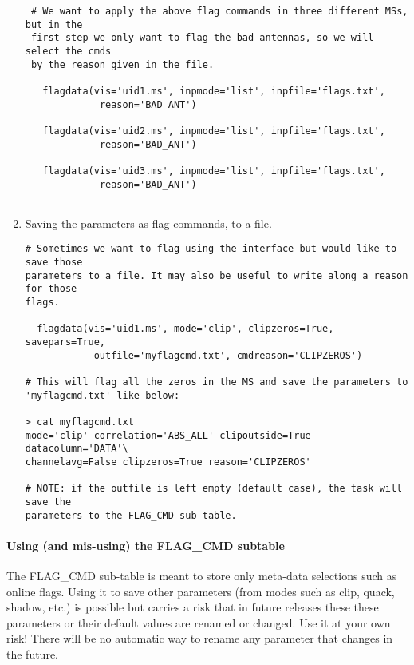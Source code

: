 \begin{enumerate}
\begin{verbatim}
 # We want to apply the above flag commands in three different MSs, but in the
 first step we only want to flag the bad antennas, so we will select the cmds
 by the reason given in the file.
 
   flagdata(vis='uid1.ms', inpmode='list', inpfile='flags.txt',
             reason='BAD_ANT')

   flagdata(vis='uid2.ms', inpmode='list', inpfile='flags.txt',
             reason='BAD_ANT')

   flagdata(vis='uid3.ms', inpmode='list', inpfile='flags.txt',
             reason='BAD_ANT')
      
\end{verbatim}

\item Saving the parameters as flag commands, to a file.

\begin{verbatim}
# Sometimes we want to flag using the interface but would like to save those
parameters to a file. It may also be useful to write along a reason for those
flags.

  flagdata(vis='uid1.ms', mode='clip', clipzeros=True, savepars=True,
            outfile='myflagcmd.txt', cmdreason='CLIPZEROS')
  
# This will flag all the zeros in the MS and save the parameters to
'myflagcmd.txt' like below:

> cat myflagcmd.txt
mode='clip' correlation='ABS_ALL' clipoutside=True datacolumn='DATA'\
channelavg=False clipzeros=True reason='CLIPZEROS'

# NOTE: if the outfile is left empty (default case), the task will save the
parameters to the FLAG_CMD sub-table.

\end{verbatim}
\end{enumerate}


\paragraph{Using (and mis-using) the FLAG\_CMD subtable}
The FLAG\_CMD sub-table is meant to store only meta-data selections such as
online flags. Using it to save other parameters (from modes such as clip, quack,
shadow, etc.) is possible but carries a risk that in future releases these
these parameters or their default values are renamed or changed.
Use it at your own risk! There will be no automatic way to rename any parameter that changes in the
future.

